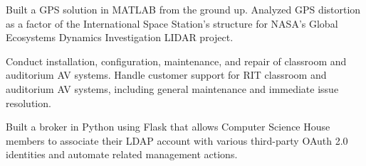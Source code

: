 \documentclass[10pt,a4paper]{altacv}
\begin{document}

\begin{fullwidth}
\marginpar{\makesidebarheader}
    \vspace*{-1\baselineskip}
\makecvheader
\end{fullwidth}
\vspace{.65\baselineskip}


Built a GPS solution in MATLAB from the ground up. Analyzed GPS distortion as a factor of the International Space Station's structure for NASA's Global Ecosystems Dynamics Investigation LIDAR project.


\divider

Conduct installation, configuration, maintenance, and repair of classroom and auditorium AV systems.
Handle customer support for RIT classroom and auditorium AV systems, including general maintenance and immediate issue resolution.



Built a broker in Python using Flask that allows Computer Science House members to associate their LDAP account with various third-party OAuth 2.0 identities and automate related management actions.
\end{document}
